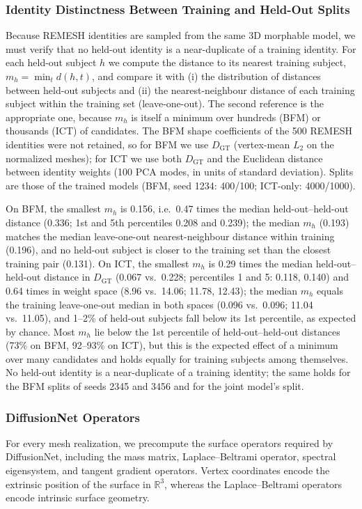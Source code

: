 \subsubsection{Identity Distinctness Between Training and Held-Out Splits}
\label{app:identity_distinctness}
Because REMESH identities are sampled from the same 3D morphable model, we
must verify that no held-out identity is a near-duplicate of a training
identity. For each held-out subject $h$ we compute the distance to its nearest
training subject, $m_h=\min_t d(h,t)$, and compare it with (i) the distribution
of distances between held-out subjects and (ii) the nearest-neighbour distance
of each training subject within the training set (leave-one-out). The second
reference is the appropriate one, because $m_h$ is itself a minimum over
hundreds (BFM) or thousands (ICT) of candidates. The BFM shape coefficients of
the 500 REMESH identities were not retained, so for BFM we use $D_{\mathrm{GT}}$
(vertex-mean $L_2$ on the normalized meshes); for ICT we use both
$D_{\mathrm{GT}}$ and the Euclidean distance between identity weights (100 PCA
modes, in units of standard deviation). Splits are those of the trained models
(BFM, seed 1234: 400/100; ICT-only: 4000/1000).

On BFM, the smallest $m_h$ is 0.156, i.e.\ 0.47 times the median
held-out--held-out distance (0.336; 1st and 5th percentiles 0.208 and 0.239);
the median $m_h$ (0.193) matches the median leave-one-out nearest-neighbour
distance within training (0.196), and no held-out subject is closer to the
training set than the closest training pair (0.131). On ICT, the smallest $m_h$
is 0.29 times the median held-out--held-out distance in $D_{\mathrm{GT}}$ (0.067
vs.\ 0.228; percentiles 1 and 5: 0.118, 0.140) and 0.64 times in weight space
(8.96 vs.\ 14.06; 11.78, 12.43); the median $m_h$ equals the training
leave-one-out median in both spaces (0.096 vs.\ 0.096; 11.04 vs.\ 11.05), and
1--2\% of held-out subjects fall below its 1st percentile, as expected by
chance. Most $m_h$ lie below the 1st percentile of held-out--held-out distances
(73\% on BFM, 92--93\% on ICT), but this is the expected effect of a minimum over
many candidates and holds equally for training subjects among themselves. No
held-out identity is a near-duplicate of a training identity; the same holds
for the BFM splits of seeds 2345 and 3456 and for the joint model's split.

\subsubsection{DiffusionNet Operators}
\label{app:diffusionnet_operators}
For every mesh realization, we precompute the surface operators required by DiffusionNet, including the mass matrix, Laplace--Beltrami operator, spectral eigensystem, and tangent gradient operators. Vertex coordinates encode the extrinsic position of the surface in $\mathbb{R}^3$, whereas the Laplace--Beltrami operators encode intrinsic surface geometry.

